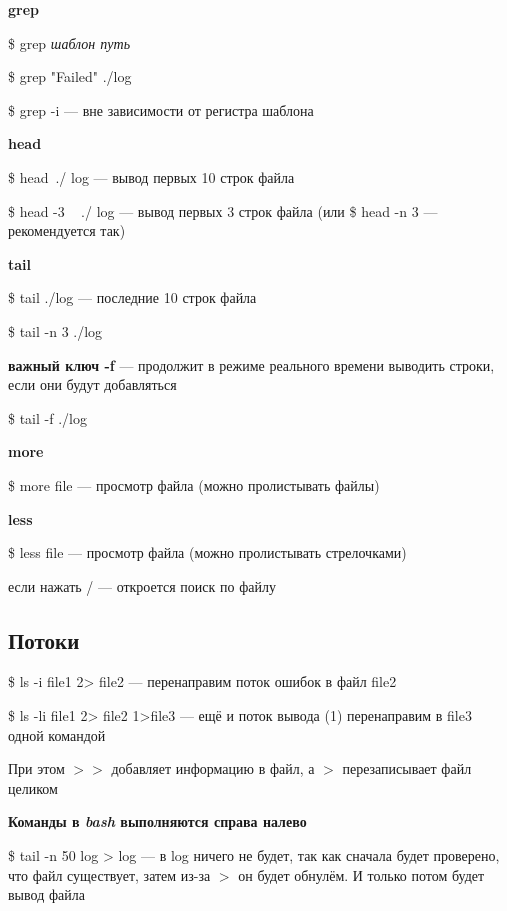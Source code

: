 \documentclass[oneside, final, 14pt]{extreport} %
\begin{document}
\textbf{grep}

\$ grep \textit{шаблон путь}

\$ grep "Failed" \hspace{0.1cm} ./log

\$ grep -i --- вне зависимости от регистра шаблона

\vspace*{\baselineskip}

\textbf{head}

\$ head~./ log --- вывод первых 10 строк файла

\$ head -3 ~ ./ log --- вывод первых 3 строк файла (или \$ head -n 3 --- рекомендуется так)

\vspace*{\baselineskip}

\textbf{tail}

\$ tail ./log --- последние 10 строк файла

\$ tail -n 3 ./log 

\textbf{важный ключ -f} --- продолжит в режиме реального времени выводить строки, если 
они будут добавляться

\$ tail -f ./log 

\vspace*{\baselineskip}

\textbf{more}

\$ more file --- просмотр файла (можно пролистывать файлы)

\vspace*{\baselineskip}

\textbf{less}

\$ less file --- просмотр файла (можно пролистывать стрелочками)

если нажать / --- откроется поиск по файлу

\subsection{Потоки}
\$ ls -i file1 2> file2 --- перенаправим поток ошибок в файл file2

\$ ls -li file1 2> file2 1>file3 --- ещё и поток вывода (1) перенаправим в file3 одной командой

При этом $>>$ добавляет информацию в файл, а $>$ перезаписывает файл целиком

\textbf{Команды в \textit{bash} выполняются справа налево}

\$ tail -n 50 log > log --- в log ничего не будет, так как сначала будет проверено, что файл существует, 
затем из-за $>$ он будет обнулём. И только потом будет вывод файла
\end{document}
